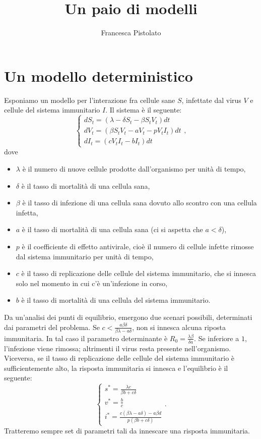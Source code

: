 \documentclass[12pt,a4paper,oneside]{amsart}
\author{Francesca Pistolato}
\title{Un paio di modelli}
\theoremstyle{definition}
\begin{document}
\maketitle

\section{Un modello deterministico}
Esponiamo un modello per l'interazione fra cellule sane $S$, infettate dal virus $V$ e cellule del sistema immunitario $I$. Il sistema è il seguente:
\begin{equation}
\begin{cases}
dS_t=\left(\lambda-\delta S_t-\beta S_tV_t\right)dt\\
dV_t=\left(\beta S_tV_t-a V_t -pV_tI_t\right)dt\\
dI_t=\left(cV_tI_t-bI_t\right)dt
\end{cases},
\end{equation}
dove \begin{itemize}
\item $\lambda$ è il numero di nuove cellule prodotte dall'organismo per unità di tempo,
\item $\delta$ è il tasso di mortalità di una cellula sana,
\item $\beta$ è il tasso di infezione di una cellula sana dovuto allo scontro con una cellula infetta,
\item $a$ è il tasso di mortalità di una cellula sana (ci si aspetta che $a<\delta$),
\item $p$ è il coefficiente di effetto antivirale, cioè il numero di cellule infette rimosse dal sistema immunitario per unità di tempo,
\item $c$ è il tasso di replicazione delle cellule del sistema immunitario, che si innesca solo nel momento in cui c'è un'infezione in corso,
\item $b$ è il tasso di mortalità di una cellula del sistema immunitario.
\end{itemize}

Da un'analisi dei punti di equilibrio, emergono due scenari possibili, determinati dai parametri del problema. Se $c<\frac{a\beta \delta}{\beta\lambda-a\delta}$, non si innesca alcuna riposta immunitaria. In tal caso il parametro determinante è $R_0=\frac{\lambda\beta}{\delta a}$. Se inferiore a $1$, l'infezione viene rimossa; altrimenti il virus resta presente nell'organismo. Viceversa, se il tasso di replicazione delle cellule del sistema immunitario è sufficientemente alto, la risposta immunitaria si innesca e l'equilibrio è il seguente: \begin{equation}
\begin{cases}
s^*=\frac{\lambda c}{\beta b+c\delta}\\
v^*=\frac{b}{c}\\
i^*=\frac{c(\beta\lambda-a\delta)-a\beta d}{p(\beta b+c\delta)}
\end{cases}.
\end{equation}
Tratteremo sempre set di parametri tali da innescare una risposta immunitaria.
\end{document}
